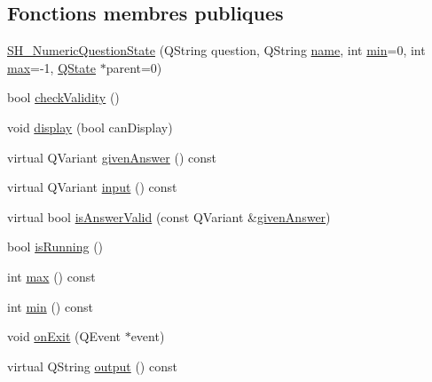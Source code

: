 \subsection*{Fonctions membres publiques}
\begin{DoxyCompactItemize}
\item 
\hyperlink{classSimpleHotel_1_1SH__NumericQuestionState_a0b47d920038a253c8f89ef299bd530c4}{S\-H\-\_\-\-Numeric\-Question\-State} (Q\-String question, Q\-String \hyperlink{classSimpleHotel_1_1SH__NamedObject_ad144716345034c91cface8f3163a799e}{name}, int \hyperlink{classSimpleHotel_1_1SH__NumericQuestionState_a3417b383fb91874a6176b9fd1e19e6a4}{min}=0, int \hyperlink{classSimpleHotel_1_1SH__NumericQuestionState_a52840eebf864939b1294ac6e7c41c64f}{max}=-\/1, \hyperlink{classQState}{Q\-State} $\ast$parent=0)
\item 
bool \hyperlink{classSimpleHotel_1_1SH__QuestionState_a0fd7e76443cfd6f0329b085358e30355}{check\-Validity} ()
\item 
void \hyperlink{classSimpleHotel_1_1SH__InOutState_a1cbe5befe4f42e0941165498ed0117a9}{display} (bool can\-Display)
\item 
virtual Q\-Variant \hyperlink{classSimpleHotel_1_1SH__QuestionState_a243f09bc1f822af7748edb038ac2957c}{given\-Answer} () const 
\item 
virtual Q\-Variant \hyperlink{classSimpleHotel_1_1SH__InOutState_a487d2ca6200fed372b1a27cfa27774db}{input} () const 
\item 
virtual bool \hyperlink{classSimpleHotel_1_1SH__NumericQuestionState_acfef357cecf511d31d2c992252b91c40}{is\-Answer\-Valid} (const Q\-Variant \&\hyperlink{classSimpleHotel_1_1SH__QuestionState_a243f09bc1f822af7748edb038ac2957c}{given\-Answer})
\item 
bool \hyperlink{classSimpleHotel_1_1SH__GenericState_a5151ff071129bdd4dcf7c60cb93794da}{is\-Running} ()
\item 
int \hyperlink{classSimpleHotel_1_1SH__NumericQuestionState_a52840eebf864939b1294ac6e7c41c64f}{max} () const 
\item 
int \hyperlink{classSimpleHotel_1_1SH__NumericQuestionState_a3417b383fb91874a6176b9fd1e19e6a4}{min} () const 
\item 
void \hyperlink{classSimpleHotel_1_1SH__InOutState_aa5fc1b9281087bd8abcd6873d2a36009}{on\-Exit} (Q\-Event $\ast$event)
\item 
virtual Q\-String \hyperlink{classSimpleHotel_1_1SH__InOutState_a71b15e4d49b9c2aa540500065ceb39da}{output} () const 
\item 

\end{DoxyCompactItemize}
